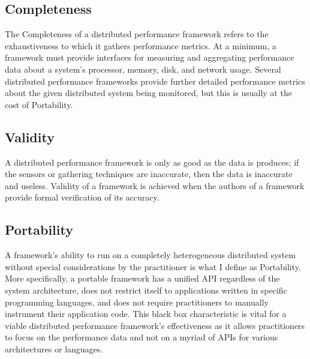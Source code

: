 \subsection{Completeness}

The Completeness of a distributed performance framework refers to the exhaustiveness to which it gathers performance
metrics. At a minimum, a framework must provide interfaces for measuring and aggregating performance data about a
system's processor, memory, disk, and network usage. Several distributed performance frameworks provide further detailed
performance metrics about the given distributed system being monitored, but this is usually at the cost of Portability.

\subsection{Validity}

A distributed performance framework is only as good as the data is produces; if the sensors or gathering techniques are
inaccurate, then the data is inaccurate and useless. Validity of a framework is achieved when the authors of a framework
provide formal verification of its accuracy.

\subsection{Portability}

A framework's ability to run on a completely heterogeneous distributed system without special considerations by the
practitioner is what I define as Portability. More specifically, a portable framework has a unified API regardless of
the system architecture, does not restrict itself to applications written in specific programming languages, and does
not require practitioners to manually instrument their application code. This black box characteristic is vital for a
viable distributed performance framework's effectiveness as it allows practitioners to focus on the performance data and
not on a myriad of APIs for various architectures or languages.


